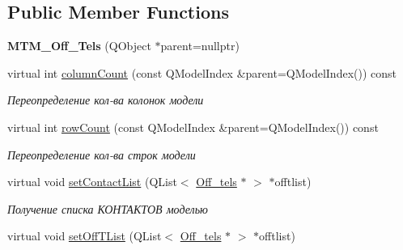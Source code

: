 \subsection*{Public Member Functions}
\begin{DoxyCompactItemize}
\item 
\mbox{\label{class_m_t_m___off___tels_a34ada47ab6e3fe8c34839e9554d57173}} 
{\bfseries M\+T\+M\+\_\+\+Off\+\_\+\+Tels} (Q\+Object $\ast$parent=nullptr)
\item 
\mbox{\label{class_m_t_m___off___tels_a9155a9ff68208268653a8dc5ab4bfc14}} 
virtual int \mbox{\hyperlink{class_m_t_m___off___tels_a9155a9ff68208268653a8dc5ab4bfc14}{column\+Count}} (const Q\+Model\+Index \&parent=Q\+Model\+Index()) const
\begin{DoxyCompactList}\small\item\em Переопределение кол-\/ва колонок модели \end{DoxyCompactList}\item 
\mbox{\label{class_m_t_m___off___tels_aa4c3328aab2456c516e2a079c47caeb8}} 
virtual int \mbox{\hyperlink{class_m_t_m___off___tels_aa4c3328aab2456c516e2a079c47caeb8}{row\+Count}} (const Q\+Model\+Index \&parent=Q\+Model\+Index()) const
\begin{DoxyCompactList}\small\item\em Переопределение кол-\/ва строк модели \end{DoxyCompactList}\item 
\mbox{\label{class_m_t_m___off___tels_a38336bc536ad1b05acbfd779736e5713}} 
virtual void \mbox{\hyperlink{class_m_t_m___off___tels_a38336bc536ad1b05acbfd779736e5713}{set\+Contact\+List}} (Q\+List$<$ \mbox{\hyperlink{class_off__tels}{Off\+\_\+tels}} $\ast$ $>$ $\ast$offtlist)
\begin{DoxyCompactList}\small\item\em Получение списка КОНТАКТОВ моделью \end{DoxyCompactList}\item 
\mbox{\label{class_m_t_m___off___tels_a8cd1fc74968ce5809d9f80ff62b71031}} 
virtual void \mbox{\hyperlink{class_m_t_m___off___tels_a8cd1fc74968ce5809d9f80ff62b71031}{set\+Off\+T\+List}} (Q\+List$<$ \mbox{\hyperlink{class_off__tels}{Off\+\_\+tels}} $\ast$ $>$ $\ast$offtlist)

\end{DoxyCompactItemize}
